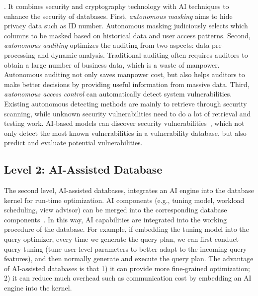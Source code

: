 . It combines security and cryptography technology with AI techniques to enhance the security of databases. First, \textit{autonomous masking} aims to hide privacy data such as ID number.  Autonomous masking judiciously selects which columns to be masked based on historical data and user access patterns.  %
Second, \textit{autonomous auditing} optimizes the auditing from two aspects: data pre-processing and dynamic analysis. Traditional auditing often requires auditors to obtain a large number of business data, which is a waste of manpower. Autonomous auditing not only saves manpower cost, but also helps auditors to make better decisions by providing useful information from massive data.  Third, \textit{autonomous access control} can automatically detect system vulnerabilities. Existing autonomous detecting methods are mainly to retrieve through security scanning, while unknown security vulnerabilities need to do a lot of retrieval and testing work.  AI-based models can discover security vulnerabilities~\cite{DBLP:journals/corr/abs-1902-10680}, which not only detect the most known vulnerabilities in a vulnerability database, but also predict and evaluate potential vulnerabilities. 


\subsection{Level 2: AI-Assisted Database}
\label{subsec: assisted}

The second level, AI-assisted databases, integrates an AI engine into the database kernel for run-time optimization. AI components (e.g., tuning model, workload scheduling, view advisor) can be merged into the corresponding database components~\cite{DBLP:journals/corr/abs-1903-01363}. In this way, AI capabilities are integrated into the working procedure of the database. For example, if embedding the tuning model into the query optimizer, every time we generate the query plan, we can first conduct query tuning (tune user-level parameters to better adapt to the incoming query features), and then normally generate and execute the query plan. The advantage of AI-assisted databases is that 1) it can provide more fine-grained optimization; 2) it can reduce much overhead such as communication cost by embedding an AI engine into the kernel. 

